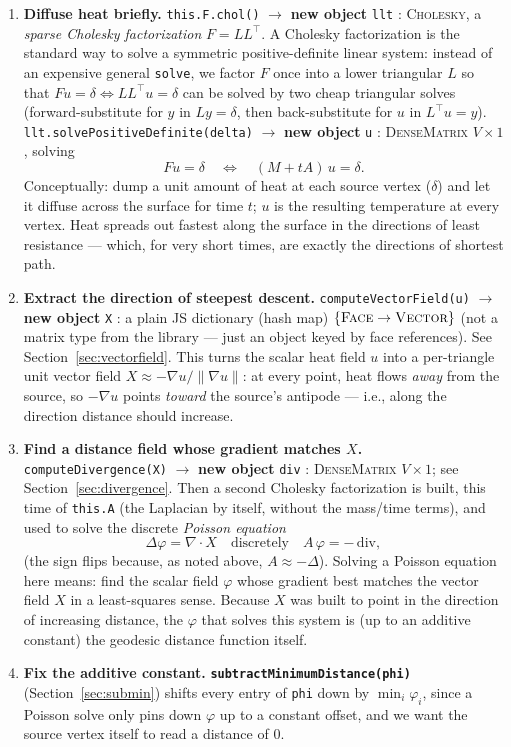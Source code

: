 \documentclass[11pt]{article}
\newcommand{\code}[1]{\texttt{#1}}
\newcommand{\func}[1]{\texttt{\textbf{#1}}}
\newcommand{\type}[1]{\textsc{#1}}
\begin{document}
\begin{enumerate}[leftmargin=1.6em]
\item \textbf{Diffuse heat briefly.} \code{this.F.chol()} $\to$ \textbf{new object}
  \code{llt} : \type{Cholesky}, a \emph{sparse Cholesky factorization} $F = LL^{\top}$. A
  Cholesky factorization is the standard way to solve a symmetric positive-definite linear
  system: instead of an expensive general \code{solve}, we factor $F$ once into a lower
  triangular $L$ so that $Fu=\delta \Leftrightarrow LL^{\top}u=\delta$ can be solved by two
  cheap triangular solves (forward-substitute for $y$ in $Ly=\delta$, then
  back-substitute for $u$ in $L^{\top}u=y$). \code{llt.solvePositiveDefinite(delta)} $\to$
  \textbf{new object} \code{u} : \type{DenseMatrix} $V\times1$, solving
  \[
    F u = \delta \quad\Longleftrightarrow\quad (M+tA)\,u=\delta .
  \]
  Conceptually: dump a unit amount of heat at each source vertex ($\delta$) and let it
  diffuse across the surface for time $t$; $u$ is the resulting temperature at every
  vertex. Heat spreads out fastest along the surface in the directions of least
  resistance --- which, for very short times, are exactly the directions of shortest path.

\item \textbf{Extract the direction of steepest descent.} \code{computeVectorField(u)} $\to$
  \textbf{new object} \code{X} : a plain JS dictionary (hash map) $\{\type{Face}\to
  \type{Vector}\}$ (not a matrix type from the library --- just an object keyed by face
  references). See Section~\ref{sec:vectorfield}. This turns the scalar heat field $u$ into
  a per-triangle unit vector field $X\approx -\nabla u/\lVert\nabla u\rVert$: at every
  point, heat flows \emph{away} from the source, so $-\nabla u$ points \emph{toward} the
  source's antipode --- i.e., along the direction distance should increase.

\item \textbf{Find a distance field whose gradient matches $X$.} \code{computeDivergence(X)}
  $\to$ \textbf{new object} \code{div} : \type{DenseMatrix} $V\times1$; see
  Section~\ref{sec:divergence}. Then a second Cholesky factorization is built, this time of
  \code{this.A} (the Laplacian by itself, without the mass/time terms), and used to solve
  the discrete \emph{Poisson equation}
  \[
    \Delta \varphi = \nabla\!\cdot\! X
    \quad\text{discretely}\quad
    A\,\varphi = -\,\mathrm{div},
  \]
  (the sign flips because, as noted above, $A\approx-\Delta$). Solving a Poisson equation
  here means: find the scalar field $\varphi$ whose gradient best matches the vector field
  $X$ in a least-squares sense. Because $X$ was built to point in the direction of
  increasing distance, the $\varphi$ that solves this system is (up to an additive
  constant) the geodesic distance function itself.

\item \textbf{Fix the additive constant.} \func{subtractMinimumDistance(phi)}
  (Section~\ref{sec:submin}) shifts every entry of \code{phi} down by $\min_i\varphi_i$, since
  a Poisson solve only pins down $\varphi$ up to a constant offset, and we want the source
  vertex itself to read a distance of $0$.
\end{enumerate}
\end{document}
